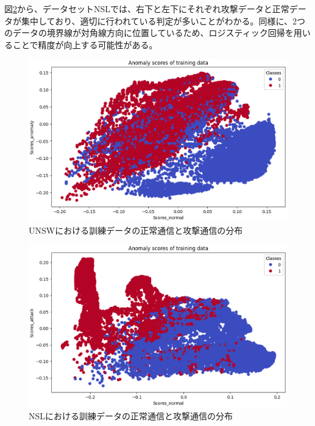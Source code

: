 \documentclass{css}
\begin{document}
図\ref{fig:NSL1}から、データセットNSLでは、右下と左下にそれぞれ攻撃データと正常データが集中しており、適切に行われている判定が多いことがわかる。同様に、2つのデータの境界線が対角線方向に位置しているため、ロジスティック回帰を用いることで精度が向上する可能性がある。

\begin{figure}[ht]
    \centering
    \includegraphics[width=\linewidth]{pictures/eps/UNSW1.eps}
    \caption{UNSWにおける訓練データの正常通信と攻撃通信の分布}
    \label{fig:UNSW1}
\end{figure}

\begin{figure}[ht]
    \centering
    \includegraphics[width=\linewidth]{pictures/eps/NSL1.eps}
    \caption{NSLにおける訓練データの正常通信と攻撃通信の分布}
    \label{fig:NSL1}
\end{figure}
\end{document}
